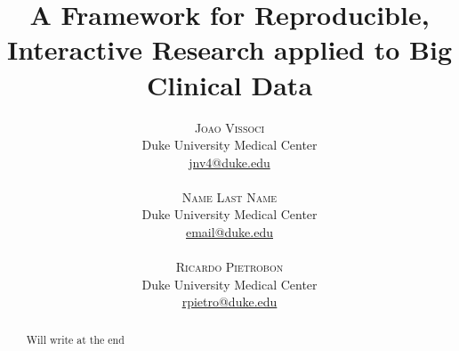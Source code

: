 \documentclass[twoside]{article}
\title{\vspace{-15mm}\fontsize{24pt}{10pt}\selectfont\textbf{A Framework for Reproducible, Interactive Research applied to Big Clinical Data}} %
\author{
\large
\textsc{Joao Vissoci}\\[2mm] %
\normalsize Duke University Medical Center \\ %
\normalsize \href{mailto:jnv4@duke.edu}{jnv4@duke.edu} \\\\%
\textsc{Name Last Name}\\[2mm] %
\normalsize Duke University Medical Center \\ %
\normalsize \href{mailto:email@duke.edu}{email@duke.edu} \\\\%
\textsc{Ricardo Pietrobon}\\[2mm] %
\normalsize Duke University  Medical Center\\ %
\normalsize \href{mailto:rpietro@duke.edu}{rpietro@duke.edu} \\%
\vspace{-5mm}
}
\date{}
\begin{document}
\maketitle %

\thispagestyle{fancy} %


\begin{abstract}

Will write at the end

\end{abstract}

\end{document}
